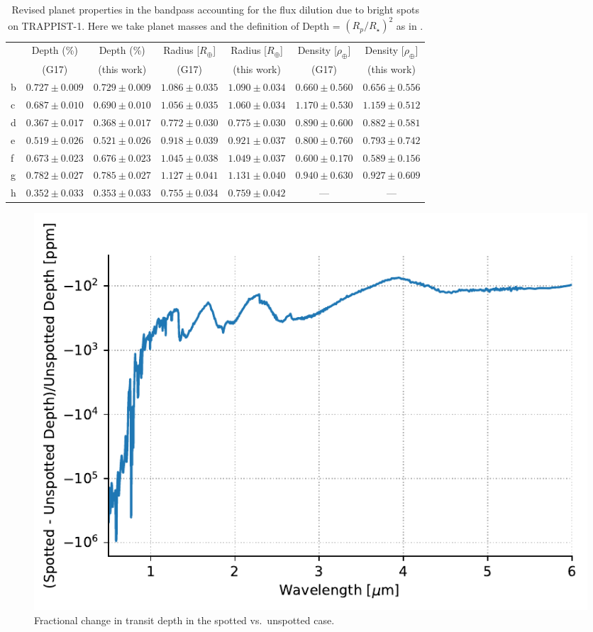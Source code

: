 \begin{subappendices}
\begin{table}
\centering
\begin{tabular}{l|cccccc}
 & Depth (\%) & Depth (\%) & Radius [$R_\oplus$] & Radius [$R_\oplus$] & Density [$\rho_\oplus$]& Density [$\rho_\oplus$] \\
& (G17) & (this work) & (G17) & (this work)  & (G17) & (this work) \\ \hline
b & $0.727 \pm 0.009$ & $0.729 \pm 0.009$ & $1.086 \pm 0.035$ & $1.090 \pm 0.034$ & $0.660 \pm 0.560$ & $0.656 \pm 0.556$ \\
c & $0.687 \pm 0.010$ & $0.690 \pm 0.010$ & $1.056 \pm 0.035$ & $1.060 \pm 0.034$ & $1.170 \pm 0.530$ & $1.159 \pm 0.512$ \\
d & $0.367 \pm 0.017$ & $0.368 \pm 0.017$ & $0.772 \pm 0.030$ & $0.775 \pm 0.030$ & $0.890 \pm 0.600$ & $0.882 \pm 0.581$ \\
e & $0.519 \pm 0.026$ & $0.521 \pm 0.026$ & $0.918 \pm 0.039$ & $0.921 \pm 0.037$ & $0.800 \pm 0.760$ & $0.793 \pm 0.742$ \\
f & $0.673 \pm 0.023$ & $0.676 \pm 0.023$ & $1.045 \pm 0.038$ & $1.049 \pm 0.037$ & $0.600 \pm 0.170$ & $0.589 \pm 0.156$ \\
g & $0.782 \pm 0.027$ & $0.785 \pm 0.027$ & $1.127 \pm 0.041$ & $1.131 \pm 0.040$ & $0.940 \pm 0.630$ & $0.927 \pm 0.609$ \\
h & $0.352 \pm 0.033$ & $0.353 \pm 0.033$ & $0.755 \pm 0.034$ & $0.759 \pm 0.042$ & --- & --- \\
\end{tabular}
\caption{Revised planet properties in the \kepler bandpass accounting for the flux dilution due to bright spots on TRAPPIST-1. Here we take planet masses and the definition of Depth = $(R_p/R_\star)^2$ as in \citet{Gillon2017}. \label{tab:planets}}
\end{table}

\begin{figure}
\begin{center}
\includegraphics[scale=0.7]{trappist1_bright/transmission_spectrum.pdf}
\end{center}
\caption{Fractional change in transit depth in the spotted vs.\ unspotted case.  \label{fig:transmission}}
\end{figure}



\end{subappendices}
